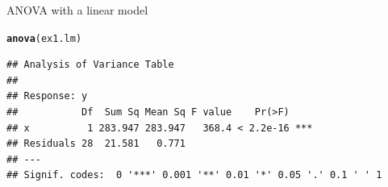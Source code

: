 \documentclass[aspectratio=169]{beamer}\usepackage[]{graphicx}\usepackage[]{color}
\makeatletter
\newcommand{\hlstd}[1]{\textcolor[rgb]{0.345,0.345,0.345}{#1}}%
\newcommand{\hlkwd}[1]{\textcolor[rgb]{0.737,0.353,0.396}{\textbf{#1}}}%
\newenvironment{kframe}{%
 \def\at@end@of@kframe{}%
 \ifinner\ifhmode%
  \def\at@end@of@kframe{\end{minipage}}%
  \begin{minipage}{\columnwidth}%
 \fi\fi%
 \def\FrameCommand##1{\hskip\@totalleftmargin \hskip-\fboxsep
 \colorbox{shadecolor}{##1}\hskip-\fboxsep
     \hskip-\linewidth \hskip-\@totalleftmargin \hskip\columnwidth}%
 \MakeFramed {\advance\hsize-\width
   \@totalleftmargin\z@ \linewidth\hsize
   \@setminipage}}%
 {\par\unskip\endMakeFramed%
 \at@end@of@kframe}
\newenvironment{knitrout}{}{} %
\makeatother
\begin{document}
% 
\begin{frame}[fragile]{ANOVA with a linear model}
\begin{knitrout}\scriptsize
{}\color{fgcolor}\begin{kframe}
\begin{alltt}
\hlkwd{anova}\hlstd{(ex1.lm)}
\end{alltt}
\begin{verbatim}
## Analysis of Variance Table
## 
## Response: y
##           Df  Sum Sq Mean Sq F value    Pr(>F)    
## x          1 283.947 283.947   368.4 < 2.2e-16 ***
## Residuals 28  21.581   0.771                      
## ---
## Signif. codes:  0 '***' 0.001 '**' 0.01 '*' 0.05 '.' 0.1 ' ' 1
\end{verbatim}
\end{kframe}
\end{knitrout}
\end{frame}
\end{document}
